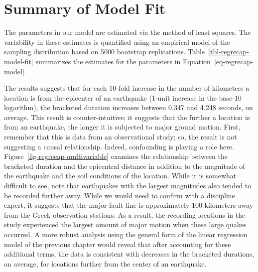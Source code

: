 \documentclass[
  letterpaper,
  DIV=11,
  numbers=noendperiod]{scrreprt}
\theoremstyle{definition}
\theoremstyle{definition}
\theoremstyle{plain}
\theoremstyle{remark}
\begin{document}
\section{Summary of Model Fit}\label{summary-of-model-fit}

The parameters in our model are estimated via the method of least
squares. The variability in these estimates is quantified using an
empirical model of the sampling distribution based on 5000 bootstrap
replications. Table~\ref{tbl-regrecap-model-fit} summarizes the
estimates for the parameters in Equation~\ref{eq-regrecap-model}.

\begin{table}

\caption{\label{tbl-regrecap-model-fit}Summary of the model
characterizing the bracketed duration of seismic events in Greece as a
function of the epicentral distance.}


\end{table}%

The results suggests that for each 10-fold increase in the number of
kilometers a location is from the epicenter of an earthquake (1-unit
increase in the base-10 logarithm), the bracketed duration increases
between 0.347 and 4.248 seconds, on average. This result is
counter-intuitive; it suggests that the further a location is from an
earthquake, the longer it is subjected to major ground motion. First,
remember that this is data from an observational study; so, the result
is not suggesting a causal relationship. Indeed, confounding is playing
a role here. Figure~\ref{fig-regrecap-multivariable} examines the
relationship between the bracketed duration and the epicentral distance
in addition to the magnitude of the earthquake and the soil conditions
of the location. While it is somewhat difficult to see, note that
earthquakes with the largest magnitudes also tended to be recorded
further away. While we would need to confirm with a discipline expert,
it suggests that the major fault line is approximately 100 kilometers
away from the Greek observation stations. As a result, the recording
locations in the study experienced the largest amount of major motion
when these large quakes occurred. A more robust analysis using the
general form of the linear regression model of the previous chapter
would reveal that after accounting for these additional terms, the data
is consistent with decreases in the bracketed durations, on average, for
locations further from the center of an earthquake.
\end{document}
